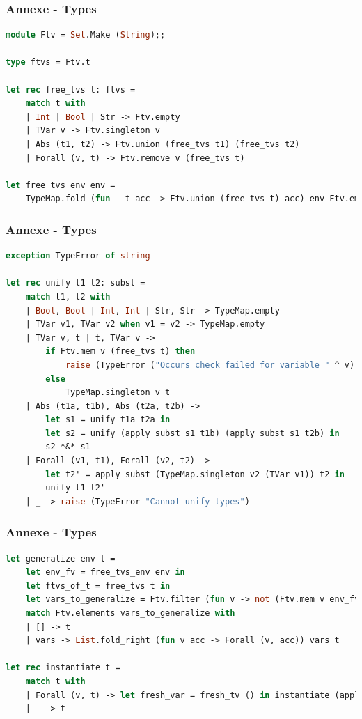 \documentclass{beamer}
\begin{document}
\begin{frame}[fragile]
		\frametitle{Annexe - Types}
		\begin{lstlisting}[language=ML]
module Ftv = Set.Make (String);;

type ftvs = Ftv.t

let rec free_tvs t: ftvs =
    match t with
    | Int | Bool | Str -> Ftv.empty
    | TVar v -> Ftv.singleton v
    | Abs (t1, t2) -> Ftv.union (free_tvs t1) (free_tvs t2)
    | Forall (v, t) -> Ftv.remove v (free_tvs t)

let free_tvs_env env =
    TypeMap.fold (fun _ t acc -> Ftv.union (free_tvs t) acc) env Ftv.empty
		\end{lstlisting}
\end{frame}

\begin{frame}[fragile]
		\frametitle{Annexe - Types}
		\begin{lstlisting}[language=ML]
exception TypeError of string

let rec unify t1 t2: subst =
    match t1, t2 with
    | Bool, Bool | Int, Int | Str, Str -> TypeMap.empty
    | TVar v1, TVar v2 when v1 = v2 -> TypeMap.empty
    | TVar v, t | t, TVar v ->
        if Ftv.mem v (free_tvs t) then
            raise (TypeError ("Occurs check failed for variable " ^ v))
        else
            TypeMap.singleton v t
    | Abs (t1a, t1b), Abs (t2a, t2b) ->
        let s1 = unify t1a t2a in
        let s2 = unify (apply_subst s1 t1b) (apply_subst s1 t2b) in
        s2 *&* s1
    | Forall (v1, t1), Forall (v2, t2) ->
        let t2' = apply_subst (TypeMap.singleton v2 (TVar v1)) t2 in
        unify t1 t2'
    | _ -> raise (TypeError "Cannot unify types")
		\end{lstlisting}
\end{frame}

\begin{frame}[fragile]
		\frametitle{Annexe - Types}
		\begin{lstlisting}[language=ML]
let generalize env t =
    let env_fv = free_tvs_env env in
    let ftvs_of_t = free_tvs t in
    let vars_to_generalize = Ftv.filter (fun v -> not (Ftv.mem v env_fv)) ftvs_of_t in
    match Ftv.elements vars_to_generalize with
    | [] -> t
    | vars -> List.fold_right (fun v acc -> Forall (v, acc)) vars t

let rec instantiate t =
    match t with
    | Forall (v, t) -> let fresh_var = fresh_tv () in instantiate (apply_subst (TypeMap.singleton v fresh_var) t)
    | _ -> t
		\end{lstlisting}
\end{frame}
\end{document}

